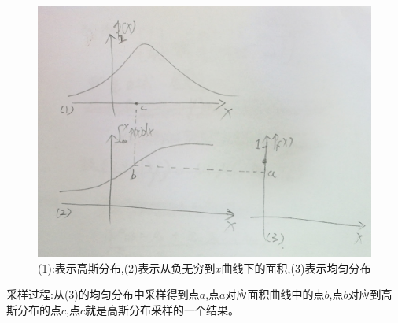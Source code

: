 \documentclass[UTF8,a4paper]{ctexart}
\begin{document}
        \begin{figure}[H]\centering
            \includegraphics[scale = 0.2]{assets/GaussianProcess_16efa.png}
            \caption{(1):表示高斯分布,(2)表示从负无穷到$x$曲线下的面积,(3)表示均匀分布}
        \end{figure}
        采样过程:从(3)的均匀分布中采样得到点$a$,点$a$对应面积曲线中的点$b$,点$b$对应到高斯分布的点$c$,点$c$就是高斯分布采样的一个结果。
\end{document}
